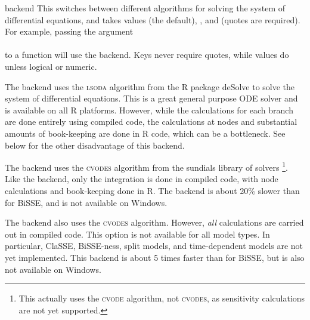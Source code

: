 \documentclass[12pt,twoside]{article}
\newenvironment{cdescription}{\begin{description}[font=\tt,leftmargin=4em,labelindent=2em,noitemsep]\addtolength{\parskip}{.75ex}}{\end{description}}
\begin{document}
\begin{cdescription}
\item[backend] This switches between different algorithms for solving
  the system of differential equations, and takes values
   (the default), , and 
  (quotes are required).  For example, passing the argument\\
  \\to a  function
  will use the  backend.  Keys never require quotes,
  while values do unless logical or numeric.

  The  backend uses the \textsc{lsoda} algorithm from
  the R package \mbox{deSolve} \citep{deSolve} to solve the system of
  differential equations.  This is a great general purpose ODE solver
  and is available on all R platforms.  However, while the
  calculations for each branch are done entirely using compiled code,
  the calculations at nodes and substantial amounts of book-keeping
  are done in R code, which can be a bottleneck.  See 
  below for the other disadvantage of this backend.
  
  The  backend uses the \textsc{cvodes} algorithm
  \citep{cvode} from the sundials library of solvers
  \citep{sundials}\footnote{This actually uses the \textsc{cvode}
    algorithm, not \textsc{cvodes}, as sensitivity calculations are
    not yet supported.}.  Like the  backend, only the
  integration is done in compiled code, with node calculations and
  book-keeping done in R.  The  backend is about 20\%
  slower than  for BiSSE, and is not available on
  Windows.

  The  backend also uses the \textsc{cvodes} algorithm.
  However, \emph{all} calculations are carried out in compiled
  code.
  This option is not available for all model types.  In particular,
  ClaSSE, BiSSE-ness, split models, and time-dependent models are not
  yet implemented.
  This backend is about 5 times faster than  for
  BiSSE, but is also not available on Windows.
  

\end{cdescription}
\end{document}
